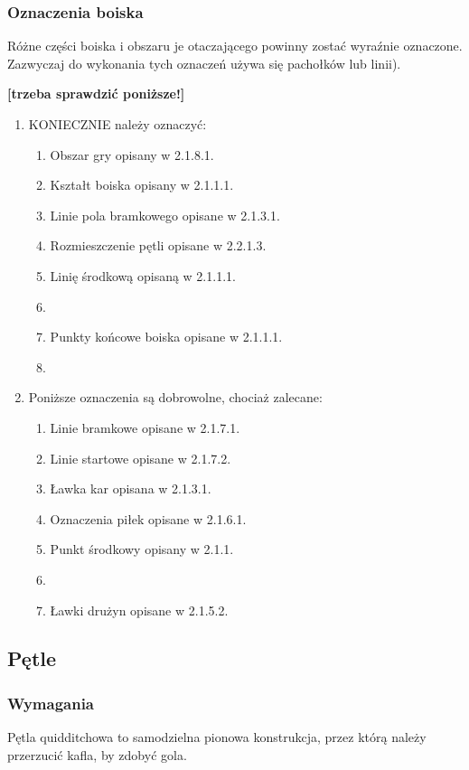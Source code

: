 \documentclass[12pt]{article}
\begin{document}
\subsubsection{Oznaczenia boiska}

Różne części boiska i obszaru je otaczającego powinny zostać wyraźnie
oznaczone. Zazwyczaj do wykonania tych oznaczeń używa się pachołków lub
linii).

\textbf{[trzeba sprawdzić poniższe!]}

\begin{enumerate}
\item
    KONIECZNIE należy oznaczyć:
  
  \begin{enumerate}
  \item Obszar gry opisany w 2.1.8.1.
  \item Kształt boiska opisany w 2.1.1.1.
  \item Linie pola bramkowego opisane w 2.1.3.1.
  \item Rozmieszczenie pętli opisane w 2.2.1.3.
  \item Linię środkową opisaną w 2.1.1.1.\item
  \item Punkty końcowe boiska opisane w 2.1.1.1.\item
  \end{enumerate}

\item Poniższe oznaczenia są dobrowolne, chociaż zalecane:
  \begin{enumerate}
  \item Linie bramkowe opisane w 2.1.7.1.
  \item Linie startowe opisane w 2.1.7.2.
  \item Ławka kar opisana w 2.1.3.1.
  \item Oznaczenia piłek opisane w 2.1.6.1.
  \item Punkt środkowy opisany w 2.1.1.\item
  \item Ławki drużyn opisane w 2.1.5.2.
  \end{enumerate}
\end{enumerate}

\subsection{Pętle}

\subsubsection{Wymagania}
Pętla quidditchowa to samodzielna pionowa
konstrukcja, przez którą należy przerzucić kafla, by zdobyć gola.
\end{document}
